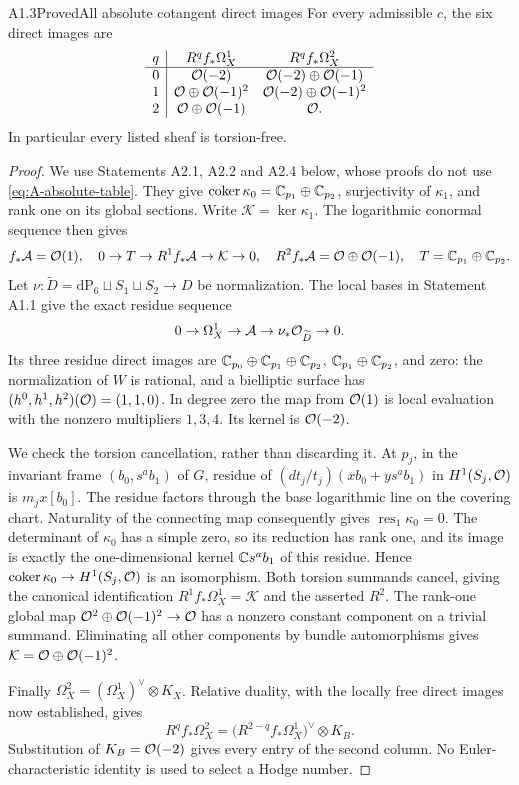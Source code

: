 \begin{claim}{A1.3}{Proved}{All absolute cotangent direct images}
For every admissible $c$, the six direct images are
\begin{equation}\label{eq:A-absolute-table}
\begin{array}{c|cc}
q&R^qf_*\Omega_X^1&R^qf_*\Omega_X^2\\\hline
0&\mathcal O(-2)&\mathcal O(-2)\oplus\mathcal O(-1)\\
1&\mathcal O\oplus\mathcal O(-1)^2&\mathcal O(-2)\oplus\mathcal O(-1)^2\\
2&\mathcal O\oplus\mathcal O(-1)&\mathcal O.
\end{array}
\end{equation}
In particular every listed sheaf is torsion-free.
\end{claim}
\begin{proof}
We use Statements A2.1, A2.2 and A2.4 below, whose proofs do not use
\eqref{eq:A-absolute-table}.  They give
$\operatorname{coker}\kappa_0=\mathbb C_{p_1}\oplus\mathbb C_{p_2}$,
surjectivity of $\kappa_1$, and rank one on its global sections.
Write $\mathcal K=\ker\kappa_1$.  The logarithmic conormal sequence
then gives
\[
f_*\mathcal A=\mathcal O(1),\quad
0\to T\to R^1f_*\mathcal A\to\mathcal K\to0,\quad
R^2f_*\mathcal A=\mathcal O\oplus\mathcal O(-1),
\quad T=\mathbb C_{p_1}\oplus\mathbb C_{p_2}.
\]
Let $\nu:\widetilde D=\mathrm{dP}_6\sqcup S_1\sqcup S_2\to D$
be normalization.  The local bases in Statement A1.1 give the exact
residue sequence
\[
0\to\Omega_X^1\to\mathcal A\to\nu_*\mathcal O_{\widetilde D}\to0.
\]
Its three residue direct images are
$\mathbb C_{p_0}\oplus\mathbb C_{p_1}\oplus\mathbb C_{p_2}$,
$\mathbb C_{p_1}\oplus\mathbb C_{p_2}$, and zero: the normalization of $W$ is
rational, and a bielliptic surface has $(h^0,h^1,h^2)(\mathcal O)=(1,1,0)$.
In degree zero the map from $\mathcal O(1)$ is local evaluation with the
nonzero multipliers $1,3,4$.  Its kernel is $\mathcal O(-2)$.

We check the torsion cancellation, rather than discarding it.  At
$p_j$, in the invariant frame $(b_0,s^ab_1)$ of $G$, residue of
$(dt_j/t_j)(x b_0+y s^ab_1)$ in $H^1(S_j,\mathcal O)$ is $m_jx[b_0]$.
The residue factors through the base logarithmic line on the covering
chart.  Naturality of the connecting map consequently gives
$\operatorname{res}_1\kappa_0=0$.  The determinant of $\kappa_0$
has a simple zero, so its reduction has rank one, and its image is
exactly the one-dimensional kernel $\mathbb C s^ab_1$ of this residue.
Hence $\operatorname{coker}\kappa_0\to H^1(S_j,\mathcal O)$ is an isomorphism.
Both torsion summands cancel, giving the canonical identification
$R^1f_*\Omega_X^1=\mathcal K$ and the asserted $R^2$.
The rank-one global map
$\mathcal O^2\oplus\mathcal O(-1)^2\to\mathcal O$ has a nonzero constant component
on a trivial summand.  Eliminating all other components by bundle
automorphisms gives
$\mathcal K=\mathcal O\oplus\mathcal O(-1)^2$.

Finally $\Omega_X^2=(\Omega_X^1)^\vee\otimes K_X$.  Relative
duality, with the locally free direct images now established, gives
\[
R^qf_*\Omega_X^2
=\bigl(R^{2-q}f_*\Omega_X^1\bigr)^\vee\otimes K_B.
\]
Substitution of $K_B=\mathcal O(-2)$ gives every entry of the second column.
No Euler-characteristic identity is used to select a Hodge number.
\end{proof}

